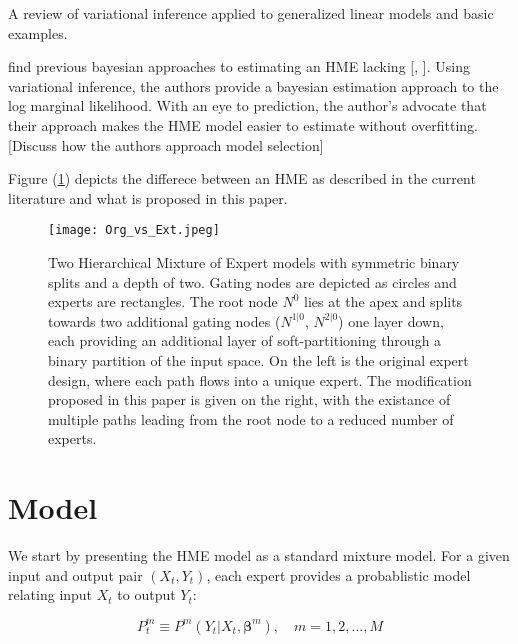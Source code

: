 \documentclass[12pt]{article}
\begin{document}
\cite{BleiKucukelbirMcAuliffe2006} A review of variational inference applied
to generalized linear models and basic examples.

\cite{UedaGhahramani2002}

\cite{BishopSvenson2003} find previous bayesian approaches to estimating an HME
lacking [\cite{HuertaJiangTanner2003}, \cite{UedaGhahramani2002}]. Using
variational inference, the authors provide a bayesian estimation approach
to the log marginal likelihood. With an eye to prediction, the author's advocate
that their approach makes the HME model easier to estimate without overfitting.
[Discuss how the authors approach model selection]


\cite{CarvalhoSkoulakis2005}

\bigskip


Figure (\ref{fig:HMEcomparison}) depicts the differece between an HME as
described in the current literature and what is proposed in this paper.

\begin{figure}[ht]
  \centering
  \texttt{[image: Org\_vs\_Ext.jpeg]}
  \caption{Two Hierarchical Mixture of Expert models with symmetric
  binary splits and a depth of two. Gating nodes are depicted as circles
  and experts are rectangles. The root node $N^{0}$ lies at the apex and
  splits towards two additional gating nodes ($N^{1|0}$, $N^{2|0}$) one layer
  down, each providing an  additional layer of soft-partitioning through a
  binary partition of the input space. On the left is the original expert
  design, where each path flows into a unique expert. The modification
  proposed in this paper is given on the right, with the existance of multiple
  paths leading from the root node to a reduced number of experts.}
  \label{fig:HMEcomparison}
\end{figure}





\section{Model} \label{sec:Model}

We start by presenting the HME model as a standard mixture model.
For a given input and output pair $(X_{t}, Y_{t})$, each expert
provides a probablistic model relating input $X_{t}$ to output
$Y_{t}$:

\begin{equation} \label{eq:ConditionalDistribution}
  P^{m}_{t} \equiv P^{m}(Y_{t}|X_{t}, \boldsymbol{\beta}^{m}), \quad m = 1,2,...,M
\end{equation}
\end{document}

